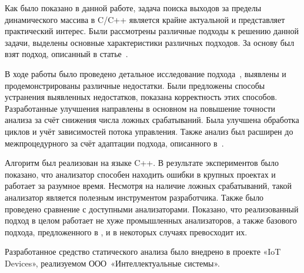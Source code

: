 
Как было показано в данной работе, задача поиска выходов за пределы
динамического массива в C/C++ является крайне актуальной и
представляет практический интерес. Были рассмотрены различные подходы
к решению данной задачи, выделены основные характеристики различных
подходов. За основу был взят подход, описанный в
статье~\cite{li2010practical}.

В ходе работы было проведено детальное исследование
подхода~\cite{li2010practical}, выявлены и продемонстрированы
различные недостатки. Были предложены способы устранения выявленных
недостатков, показана корректность этих способов. Разработанные
улучшения направлены в основном на повышение точности анализа за счёт
снижения числа ложных срабатываний. Была улучшена обработка циклов и
учёт зависимостей потока управления. Также анализ был расширен до
межпроцедурного за счёт адаптации подхода, описанного
в~\cite{xie2003archer}.

Алгоритм был реализован на языке C++. В результате экспериментов было
показано, что анализатор способен находить ошибки в крупных проектах и
работает за разумное время. Несмотря на наличие ложных срабатываний,
такой анализатор является полезным инструментом разработчика.  Также
было проведено сравнение с доступными анализаторами. Показано, что
реализованный подход в целом работает не хуже промышленных
анализаторов, а также базового подхода, предложенного в
\cite{li2010practical}, и в некоторых случаях превосходит их.

Разработанное средство статического анализа было внедрено в проекте
«IoT Devices», реализуемом ООО~«Интеллектуальные системы».

\FloatBarrier
